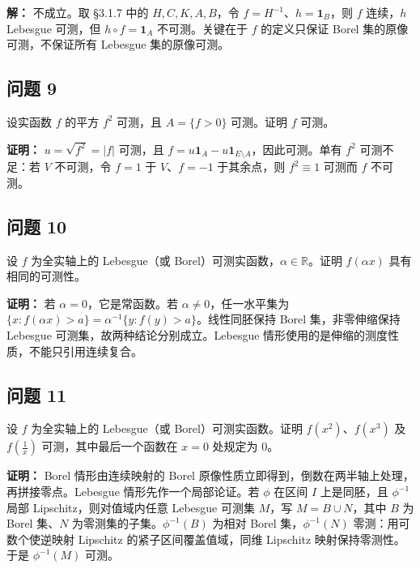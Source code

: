 \documentclass[11pt,a4paper]{article}
\begin{document}
\textbf{解：} 不成立。取 §3.1.7 中的 \(H,C,K,A,B\)，令
\(f=H^{-1}\)、\(h=\mathbf1_B\)，则 \(f\) 连续，\(h\) Lebesgue 可测，但
\(h\circ f=\mathbf1_A\) 不可测。关键在于 \(f\) 的定义只保证 Borel
集的原像可测，不保证所有 Lebesgue 集的原像可测。

\subsection{问题 9}\label{ux95eeux9898-9}

设实函数 \(f\) 的平方 \(f^2\) 可测，且 \(A=\{f>0\}\) 可测。证明 \(f\)
可测。

\textbf{证明：} \(u=\sqrt{f^2}=|f|\) 可测，且
\(f=u\mathbf1_A-u\mathbf1_{E\setminus A}\)，因此可测。单有 \(f^2\)
可测不足：若 \(V\) 不可测，令 \(f=1\) 于 \(V\)、\(f=-1\) 于其余点，则
\(f^2\equiv1\) 可测而 \(f\) 不可测。

\subsection{问题 10}\label{ux95eeux9898-10}

设 \(f\) 为全实轴上的 Lebesgue（或
Borel）可测实函数，\(\alpha\in\mathbb R\)。证明 \(f(\alpha x)\)
具有相同的可测性。

\textbf{证明：} 若 \(\alpha=0\)，它是常函数。若
\(\alpha\ne0\)，任一水平集为
\(\{x:f(\alpha x)>a\}=\alpha^{-1}\{y:f(y)>a\}\)。线性同胚保持 Borel
集，非零伸缩保持 Lebesgue 可测集，故两种结论分别成立。Lebesgue
情形使用的是伸缩的测度性质，不能只引用连续复合。

\subsection{问题 11}\label{ux95eeux9898-11}

设 \(f\) 为全实轴上的 Lebesgue（或 Borel）可测实函数。证明
\(f(x^2)\)、\(f(x^3)\) 及 \(f(\frac1x)\) 可测，其中最后一个函数在
\(x=0\) 处规定为 \(0\)。

\textbf{证明：} Borel 情形由连续映射的 Borel
原像性质立即得到，倒数在两半轴上处理，再拼接零点。Lebesgue
情形先作一个局部论证。若 \(\phi\) 在区间 \(I\) 上是同胚，且
\(\phi^{-1}\) 局部 Lipschitz，则对值域内任意 Lebesgue 可测集 \(M\)，写
\(M=B\cup N\)，其中 \(B\) 为 Borel 集、\(N\)
为零测集的子集。\(\phi^{-1}(B)\) 为相对 Borel 集，\(\phi^{-1}(N)\)
零测：用可数个使逆映射 Lipschitz 的紧子区间覆盖值域，同维 Lipschitz
映射保持零测性。于是 \(\phi^{-1}(M)\) 可测。
\end{document}
